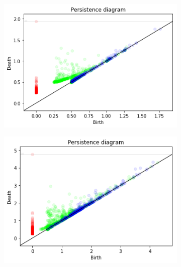 \documentclass[11pt]{article}
\begin{document}
\begin{figure}[h]
	\centering
	\begin{subfigure}{0.45\textwidth}
		\centering
		\includegraphics[width=\textwidth]{XY_images/40(0,0)pd.png}
	\end{subfigure}\hfill
	\begin{subfigure}{0.45\textwidth}
		\centering
		\includegraphics[width=\textwidth]{XY_images/140(0,0)pd.png}
	\end{subfigure}
\end{figure}
\end{document}
